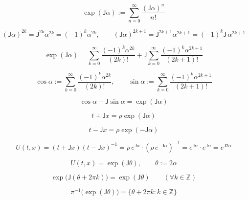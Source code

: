 \documentclass[12pt]{article}
\begin{document}
\begin{equation}
\exp(\mathsf{J}\alpha)
:=\sum_{n=0}^{\infty}\frac{(\mathsf{J}\alpha)^n}{n!}
\end{equation}

\begin{equation}
(\mathsf{J}\alpha)^{2k}=\mathsf{J}^{2k}\alpha^{2k}=(-1)^k\alpha^{2k},
\qquad
(\mathsf{J}\alpha)^{2k+1}=\mathsf{J}^{2k+1}\alpha^{2k+1}=(-1)^k\mathsf{J}\,\alpha^{2k+1}
\end{equation}

\begin{equation}
\exp(\mathsf{J}\alpha)
=\sum_{k=0}^{\infty}\frac{(-1)^k\alpha^{2k}}{(2k)!}
+\mathsf{J}\sum_{k=0}^{\infty}\frac{(-1)^k\alpha^{2k+1}}{(2k+1)!}
\end{equation}

\begin{equation}
\cos\alpha:=\sum_{k=0}^{\infty}\frac{(-1)^k\alpha^{2k}}{(2k)!},
\qquad
\sin\alpha:=\sum_{k=0}^{\infty}\frac{(-1)^k\alpha^{2k+1}}{(2k+1)!}
\end{equation}

\begin{equation}
\boxed{
\cos\alpha+\mathsf{J}\sin\alpha=\exp(\mathsf{J}\alpha)
}
\end{equation}

\begin{equation}
t+\mathsf{J}x=\rho\exp(\mathsf{J}\alpha)
\end{equation}

\begin{equation}
t-\mathsf{J}x=\rho\exp(-\mathsf{J}\alpha)
\end{equation}

\begin{equation}
U(t,x)=(t+\mathsf{J}x)(t-\mathsf{J}x)^{-1}=\rho\,e^{\mathsf{J}\alpha}\cdot(\rho\,e^{-\mathsf{J}\alpha})^{-1}=e^{\mathsf{J}\alpha}\cdot e^{\mathsf{J}\alpha}=e^{\mathsf{J}2\alpha}
\end{equation}

\begin{equation}
U(t,x)=\exp(\mathsf{J}\theta),\qquad \theta:=2\alpha
\end{equation}

\begin{equation}
\exp\!\big(\mathsf{J}(\theta+2\pi k)\big)=\exp(\mathsf{J}\theta)\qquad(\forall k\in\mathbb{Z})
\end{equation}

\begin{equation}
\pi^{-1}\bigl(\exp(\mathsf{J}\theta)\bigr)=\bigl\{\theta+2\pi k:k\in\mathbb{Z}\bigr\}
\end{equation}
\end{document}

